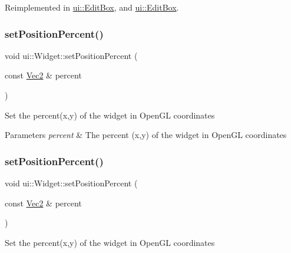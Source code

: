Reimplemented in \hyperlink{classui_1_1EditBox_a92e525c7152c0a974632d4810b392f11}{ui\+::\+Edit\+Box}, and \hyperlink{classui_1_1EditBox_a9920fc994750f83db1c80be0417143f6}{ui\+::\+Edit\+Box}.

\mbox{\label{classui_1_1Widget_a6950cd713842c572b7934e41d1244e12}} 
\subsubsection{\texorpdfstring{set\+Position\+Percent()}{setPositionPercent()}\hspace{0.1cm}{\footnotesize\ttfamily [1/2]}}
{\footnotesize\ttfamily void ui\+::\+Widget\+::set\+Position\+Percent (\begin{DoxyParamCaption}\item[{const \hyperlink{classVec2}{Vec2} \&}]{percent }\end{DoxyParamCaption})}

Set the percent(x,y) of the widget in Open\+GL coordinates


\begin{DoxyParams}{Parameters}
{\em percent} & The percent (x,y) of the widget in Open\+GL coordinates \\
\hline
\end{DoxyParams}
\mbox{\label{classui_1_1Widget_a6950cd713842c572b7934e41d1244e12}} 
\subsubsection{\texorpdfstring{set\+Position\+Percent()}{setPositionPercent()}\hspace{0.1cm}{\footnotesize\ttfamily [2/2]}}
{\footnotesize\ttfamily void ui\+::\+Widget\+::set\+Position\+Percent (\begin{DoxyParamCaption}\item[{const \hyperlink{classVec2}{Vec2} \&}]{percent }\end{DoxyParamCaption})}

Set the percent(x,y) of the widget in Open\+GL coordinates


